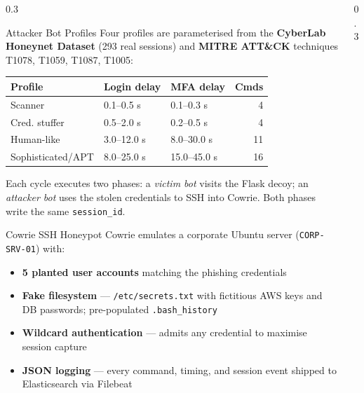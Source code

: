 \documentclass[final]{beamer}
\begin{document}
\begin{frame}[fragile]
\begin{columns}[t]
\begin{column}{0.3\paperwidth}
\begin{alertblock}{Attacker Bot Profiles}
Four profiles are parameterised from the \textbf{CyberLab Honeynet Dataset}
(293 real sessions) and \textbf{MITRE ATT\&CK} techniques T1078, T1059,
T1087, T1005:

\bigskip
\begin{center}
\begin{tabular}{lllr}
\toprule
\textbf{Profile} & \textbf{Login delay} & \textbf{MFA delay} & \textbf{Cmds} \\
\midrule
Scanner            & 0.1–0.5 s   & 0.1–0.3 s   & 4  \\
Cred. stuffer      & 0.5–2.0 s   & 0.2–0.5 s   & 4  \\
Human-like         & 3.0–12.0 s  & 8.0–30.0 s  & 11 \\
Sophisticated/APT  & 8.0–25.0 s  & 15.0–45.0 s & 16 \\
\bottomrule
\end{tabular}
\end{center}

\bigskip
Each cycle executes two phases: a \emph{victim bot} visits the Flask
decoy; an \emph{attacker bot} uses the stolen credentials to SSH into
Cowrie. Both phases write the same \texttt{session\_id}.
\end{alertblock}

\begin{block}{Cowrie SSH Honeypot}
Cowrie emulates a corporate Ubuntu server (\texttt{CORP-SRV-01}) with:
\begin{itemize}
    \item \textbf{5 planted user accounts} matching the phishing credentials
    \item \textbf{Fake filesystem} — \texttt{/etc/secrets.txt} with fictitious
          AWS keys and DB passwords; pre-populated \texttt{.bash\_history}
    \item \textbf{Wildcard authentication} — admits any credential to maximise
          session capture
    \item \textbf{JSON logging} — every command, timing, and session event
          shipped to Elasticsearch via Filebeat
\end{itemize}
\end{block}

\end{column}
\separatorcolumn

\begin{column}{0.3\paperwidth}


\end{column}
\end{columns}
\end{frame}
\end{document}
